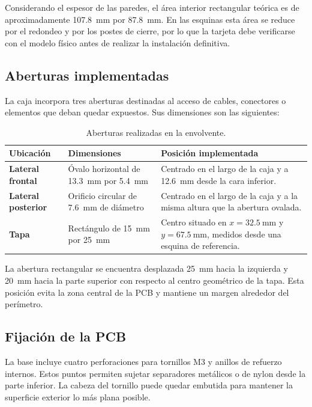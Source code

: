 \documentclass[11pt,a4paper]{article}
\begin{document}
Considerando el espesor de las paredes, el área interior rectangular teórica es de
aproximadamente \SI{107.8}{\milli\metre} por \SI{87.8}{\milli\metre}. En las esquinas
esta área se reduce por el redondeo y por los postes de cierre, por lo que la tarjeta
debe verificarse con el modelo físico antes de realizar la instalación definitiva.

\subsection{Aberturas implementadas}

La caja incorpora tres aberturas destinadas al acceso de cables, conectores o elementos
que deban quedar expuestos. Sus dimensiones son las siguientes:

\begin{table}[H]
\centering
\caption{Aberturas realizadas en la envolvente.}
\begin{tabularx}{0.96\textwidth}{>{\bfseries}p{3.4cm} p{3.7cm} X}
\toprule
Ubicación & Dimensiones & Posición implementada \\
\midrule
Lateral frontal & Óvalo horizontal de \SI{13.3}{\milli\metre} por \SI{5.4}{\milli\metre} & Centrado en el largo de la caja y a \SI{12.6}{\milli\metre} desde la cara inferior. \\
Lateral posterior & Orificio circular de \SI{7.6}{\milli\metre} de diámetro & Centrado en el largo de la caja y a la misma altura que la abertura ovalada. \\
Tapa & Rectángulo de \SI{15}{\milli\metre} por \SI{25}{\milli\metre} & Centro situado en $x=\SI{32.5}{\milli\metre}$ y $y=\SI{67.5}{\milli\metre}$, medidos desde una esquina de referencia. \\
\bottomrule
\end{tabularx}
\end{table}

La abertura rectangular se encuentra desplazada \SI{25}{\milli\metre} hacia la izquierda
y \SI{20}{\milli\metre} hacia la parte superior con respecto al centro geométrico de la
tapa. Esta posición evita la zona central de la PCB y mantiene un margen alrededor del
perímetro.

\subsection{Fijación de la PCB}

La base incluye cuatro perforaciones para tornillos M3 y anillos de refuerzo internos.
Estos puntos permiten sujetar separadores metálicos o de nylon desde la parte inferior.
La cabeza del tornillo puede quedar embutida para mantener la superficie exterior lo más
plana posible.
\end{document}
